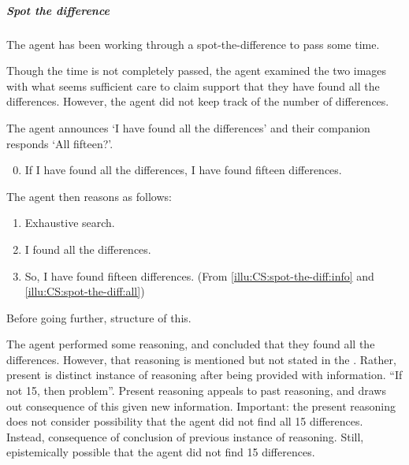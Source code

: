 \subparagraph{Spot the difference}

\begin{note}
  \begin{illustration}
    \label{illu:CS:spot-the-diff}
    The agent has been working through a spot-the-difference to pass some time.

    Though the time is not completely passed, the agent examined the two images with what seems sufficient care to claim support that they have found all the differences.
    However, the agent did not keep track of the number of differences.

    The agent announces `I have found all the differences' and their companion responds `All fifteen?'.

    \begin{enumerate}[label=\arabic*., ref=(I\ref{illu:CS:spot-the-diff}.\arabic*)]
      \setcounter{enumi}{-1}
    \item
      \label{illu:CS:spot-the-diff:info}
      If I have found all the differences, I have found fifteen differences.
    \end{enumerate}

    The agent then reasons as follows:

    \begin{enumerate}[label=\arabic*., ref=(I\ref{illu:CS:spot-the-diff}.\arabic*), resume]
    \item Exhaustive search.
    \item
      \label{illu:CS:spot-the-diff:all}
      I found all the differences.
    \item
      \label{illu:CS:spot-the-diff:fif}
      So, I have found fifteen differences. \hfill (From \ref{illu:CS:spot-the-diff:info} and \ref{illu:CS:spot-the-diff:all})
    \end{enumerate}
  \end{illustration}

  Before going further, structure of this.

  The agent performed some reasoning, and concluded that they found all the differences.
  However, that reasoning is mentioned but not stated in the .
  Rather, present is distinct instance of reasoning after being provided with information.
  ``If not 15, then problem''.
  Present reasoning appeals to past reasoning, and draws out consequence of this given new information.
  Important: the present reasoning does not consider possibility that the agent did not find all 15 differences.
  Instead, consequence of conclusion of previous instance of reasoning.
  Still, epistemically possible that the agent did not find 15 differences.
\end{note}

